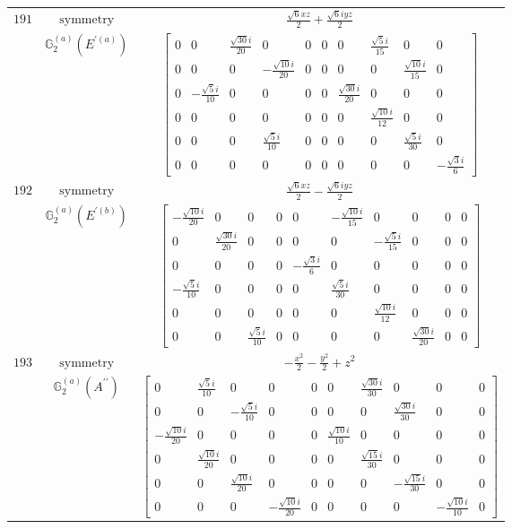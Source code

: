 \documentclass[fleqn,8pt,landscape]{jsarticle}
\begin{document}
\begin{longtable}{ccc}
$ 191 $ & $ \text{symmetry} $ & $ \frac{\sqrt{6} x z}{2} + \frac{\sqrt{6} i y z}{2} $ \\
$  $ & $ \mathbb{G}_{2}^{(a)}(E^{\prime(a)}) $ & $ \begin{bmatrix} 0 & 0 & \frac{\sqrt{30} i}{20} & 0 & 0 & 0 & 0 & \frac{\sqrt{5} i}{15} & 0 & 0 \\ 0 & 0 & 0 & - \frac{\sqrt{10} i}{20} & 0 & 0 & 0 & 0 & \frac{\sqrt{10} i}{15} & 0 \\ 0 & - \frac{\sqrt{5} i}{10} & 0 & 0 & 0 & 0 & \frac{\sqrt{30} i}{20} & 0 & 0 & 0 \\ 0 & 0 & 0 & 0 & 0 & 0 & 0 & \frac{\sqrt{10} i}{12} & 0 & 0 \\ 0 & 0 & 0 & \frac{\sqrt{5} i}{10} & 0 & 0 & 0 & 0 & \frac{\sqrt{5} i}{30} & 0 \\ 0 & 0 & 0 & 0 & 0 & 0 & 0 & 0 & 0 & - \frac{\sqrt{3} i}{6} \end{bmatrix} $ \\ \hline
$ 192 $ & $ \text{symmetry} $ & $ \frac{\sqrt{6} x z}{2} - \frac{\sqrt{6} i y z}{2} $ \\
$  $ & $ \mathbb{G}_{2}^{(a)}(E^{\prime(b)}) $ & $ \begin{bmatrix} - \frac{\sqrt{10} i}{20} & 0 & 0 & 0 & 0 & - \frac{\sqrt{10} i}{15} & 0 & 0 & 0 & 0 \\ 0 & \frac{\sqrt{30} i}{20} & 0 & 0 & 0 & 0 & - \frac{\sqrt{5} i}{15} & 0 & 0 & 0 \\ 0 & 0 & 0 & 0 & - \frac{\sqrt{3} i}{6} & 0 & 0 & 0 & 0 & 0 \\ - \frac{\sqrt{5} i}{10} & 0 & 0 & 0 & 0 & \frac{\sqrt{5} i}{30} & 0 & 0 & 0 & 0 \\ 0 & 0 & 0 & 0 & 0 & 0 & \frac{\sqrt{10} i}{12} & 0 & 0 & 0 \\ 0 & 0 & \frac{\sqrt{5} i}{10} & 0 & 0 & 0 & 0 & \frac{\sqrt{30} i}{20} & 0 & 0 \end{bmatrix} $ \\ \hline
$ 193 $ & $ \text{symmetry} $ & $ - \frac{x^{2}}{2} - \frac{y^{2}}{2} + z^{2} $ \\
$  $ & $ \mathbb{G}_{2}^{(a)}(A^{\prime\prime}) $ & $ \begin{bmatrix} 0 & \frac{\sqrt{5} i}{10} & 0 & 0 & 0 & 0 & \frac{\sqrt{30} i}{30} & 0 & 0 & 0 \\ 0 & 0 & - \frac{\sqrt{5} i}{10} & 0 & 0 & 0 & 0 & \frac{\sqrt{30} i}{30} & 0 & 0 \\ - \frac{\sqrt{10} i}{20} & 0 & 0 & 0 & 0 & \frac{\sqrt{10} i}{10} & 0 & 0 & 0 & 0 \\ 0 & \frac{\sqrt{10} i}{20} & 0 & 0 & 0 & 0 & \frac{\sqrt{15} i}{30} & 0 & 0 & 0 \\ 0 & 0 & \frac{\sqrt{10} i}{20} & 0 & 0 & 0 & 0 & - \frac{\sqrt{15} i}{30} & 0 & 0 \\ 0 & 0 & 0 & - \frac{\sqrt{10} i}{20} & 0 & 0 & 0 & 0 & - \frac{\sqrt{10} i}{10} & 0 \end{bmatrix} $ \\ \hline

\end{longtable}
\end{document}
